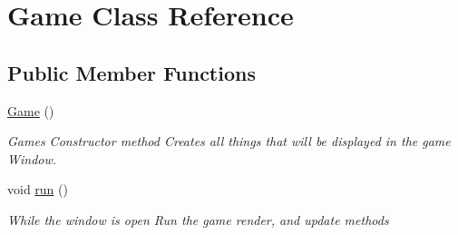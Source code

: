 \hypertarget{class_game}{}\section{Game Class Reference}
\label{class_game}
\subsection*{Public Member Functions}
\begin{DoxyCompactItemize}
\item 
\mbox{\hyperlink{class_game_ad59df6562a58a614fda24622d3715b65}{Game}} ()
\begin{DoxyCompactList}\small\item\em Games Constructor method Creates all things that will be displayed in the game Window. \end{DoxyCompactList}\item 
void \mbox{\hyperlink{class_game_a1ab78f5ed0d5ea879157357cf2fb2afa}{run}} ()
\begin{DoxyCompactList}\small\item\em While the window is open Run the game render, and update methods \end{DoxyCompactList}\end{DoxyCompactItemize}
